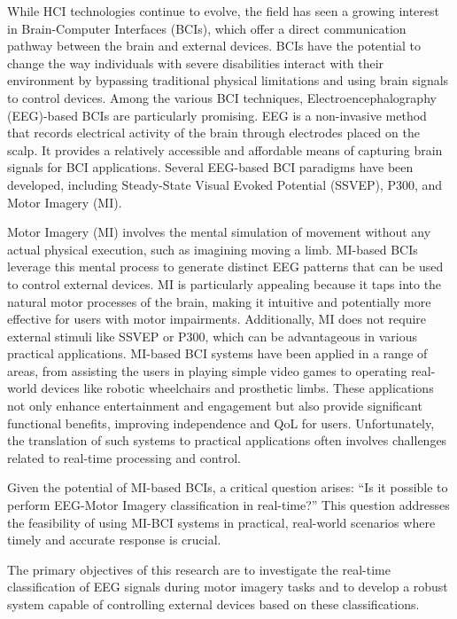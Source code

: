 While HCI technologies continue to evolve, the field has seen a growing interest in Brain-Computer Interfaces (BCIs), which offer a direct communication pathway between the brain and external devices. 
BCIs have the potential to change the way individuals with severe disabilities interact with their environment by bypassing traditional physical limitations and using brain signals to control devices.
Among the various BCI techniques, Electroencephalography (EEG)-based BCIs are particularly promising. 
EEG is a non-invasive method that records electrical activity of the brain through electrodes placed on the scalp. 
It provides a relatively accessible and affordable means of capturing brain signals for BCI applications. 
Several EEG-based BCI paradigms have been developed, including Steady-State Visual Evoked Potential (SSVEP), P300, and Motor Imagery (MI).

Motor Imagery (MI) involves the mental simulation of movement without any actual physical execution, such as imagining moving a limb. 
MI-based BCIs leverage this mental process to generate distinct EEG patterns that can be used to control external devices. 
MI is particularly appealing because it taps into the natural motor processes of the brain, making it intuitive and potentially more effective for users with motor impairments. 
Additionally, MI does not require external stimuli like SSVEP or P300, which can be advantageous in various practical applications.
MI-based BCI systems have been applied in a range of areas, from assisting the users in playing simple video games to operating real-world devices like robotic wheelchairs and prosthetic limbs.
These applications not only enhance entertainment and engagement but also provide significant functional benefits, improving independence and QoL for users.
Unfortunately, the translation of such systems to practical applications often involves challenges related to real-time processing and control.

Given the potential of MI-based BCIs, a critical question arises: ``Is it possible to perform EEG-Motor Imagery classification in real-time?'' 
This question addresses the feasibility of using MI-BCI systems in practical, real-world scenarios where timely and accurate response is crucial.

The primary objectives of this research are to investigate the real-time classification of EEG signals during motor imagery tasks and to develop a robust system capable of controlling external devices based on these classifications. 

